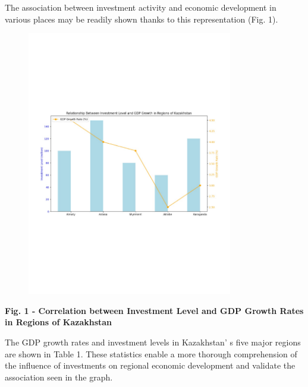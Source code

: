 The association between investment activity and economic development in
various places may be readily shown thanks to this representation (Fig.
1).

\begin{figure}[H]
	\centering
	\includegraphics[width=0.8\textwidth]{media/ekon/image3}
	\caption*{}
\end{figure}


{\bfseries Fig. 1 - Correlation between Investment Level and GDP Growth
Rates in Regions of Kazakhstan}

The GDP growth rates and investment levels in
Kazakhstan' s five major regions are shown in Table 1.
These statistics enable a more thorough comprehension of the influence
of investments on regional economic development and validate the
association seen in the graph.

